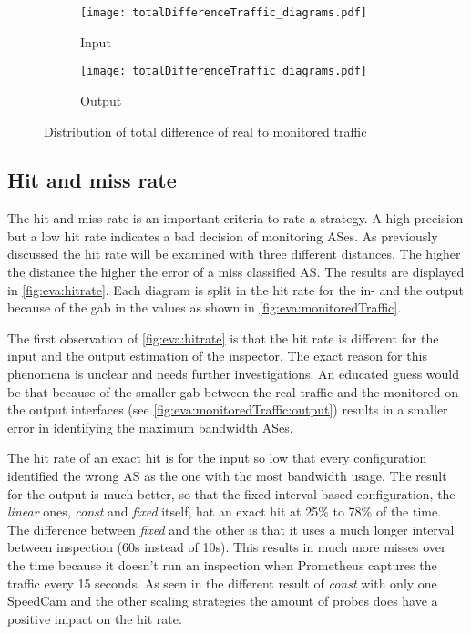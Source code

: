 \documentclass[thesis.tex]{subfiles}
\begin{document}
\begin{figure}[h]
	\centering
	\begin{subfigure}{.8\linewidth}
		\centering
		\texttt{[image: totalDifferenceTraffic\_diagrams.pdf]}
		\caption{Input}
		\label{fig:eva:precisionTotal:input}
	\end{subfigure}
	\begin{subfigure}{0.8\linewidth}
		\centering
		\texttt{[image: totalDifferenceTraffic\_diagrams.pdf]}
		\caption{Output}
		\label{fig:eva:precisionTotal:output}
	\end{subfigure}
	\caption{Distribution of total difference of real to monitored traffic}
	\label{fig:eva:precisionTotal}
\end{figure}


\subsection{Hit and miss rate} \label{sec:eva:hitrate}
The hit and miss rate is an important criteria to rate a strategy. A high precision but a low hit rate indicates a bad decision of monitoring ASes. As previously discussed the hit rate will be examined with three different distances. The higher the distance the higher the error of a miss classified AS. The results are displayed in \autoref{fig:eva:hitrate}. Each diagram is split in the hit rate for the in- and the output because of the gab in the values as shown in \autoref{fig:eva:monitoredTraffic}.

The first observation of \autoref{fig:eva:hitrate} is that the hit rate is different for the input and the output estimation of the inspector. The exact reason for this phenomena is unclear and needs further investigations. An educated guess would be that because of the smaller gab between the real traffic and the monitored on the output interfaces (see \autoref{fig:eva:monitoredTraffic:output}) results in a smaller error in identifying the maximum bandwidth ASes.

The hit rate of an exact hit is for the input so low that every configuration identified the wrong AS as the one with the most bandwidth usage. The result for the output is much better, so that the fixed interval based configuration, the \textit{linear} ones, \textit{const} and \textit{fixed} itself, hat an exact hit at 25\% to 78\% of the time. The difference between \textit{fixed} and the other is that it uses a much longer interval between inspection (60s instead of 10s). This results in much more misses over the time because it doesn't run an inspection when Prometheus captures the traffic every 15 seconds. As seen in the different result of \textit{const} with only one SpeedCam and the other scaling strategies the amount of probes does have a positive impact on the hit rate. 
\end{document}
